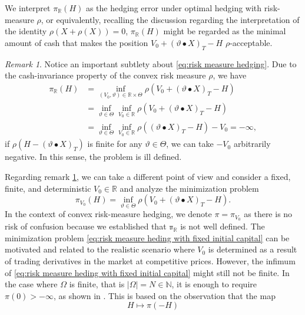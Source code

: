 \documentclass[11pt,a4paper,twoside,openany]{report}
\numberwithin{equation}{section}
\theoremstyle{plain} %
\theoremstyle{definition} %
\theoremstyle{remark} %
\newtheorem{remark}[theorem]{Remark}
\let\parencite\authnumparencite
\begin{document}
We interpret \(\pi_{\mathbb{R}}(H)\) as the hedging error under optimal hedging with risk-measure \(\rho\), or equivalently, recalling the discussion regarding the interpretation of the identity \(\rho(X+\rho(X))=0\), \(\pi_{\mathbb{R}}(H)\) might be regarded as the minimal amount of cash that makes the position \(V_0+(\vartheta\bullet X)_T-H\) \(\rho\)-acceptable. 
\begin{remark}\label{rem:ill posed problem}
Notice an important subtlety about \eqref{eq:risk measure hedging}. Due to the cash-invariance property of the convex risk measure \(\rho\), we have 
\begin{align*}
    \pi_{\mathbb{R}}(H) &= \inf_{(V_0,\vartheta)\in\mathbb{R}\times \Theta}\rho(V_0+(\vartheta\bullet X)_T-H)\\
    &=\inf_{\vartheta\in \Theta}\inf_{V_0\in\mathbb{R}}\rho(V_0+(\vartheta\bullet X)_T-H)\\
    &=\inf_{\vartheta\in \Theta}\inf_{V_0\in\mathbb{R}}\rho((\vartheta\bullet X)_T-H)-V_0=-\infty,
\end{align*}
if \(\rho(H-(\vartheta\bullet X)_T)\) is finite for any \(\vartheta\in\Theta\),
 we can take \(-V_0\) arbitrarily negative. In this sense, the problem is ill defined. 
\end{remark}
Regarding remark \ref{rem:ill posed problem}, 
we can take a different point of view and consider a fixed, finite, and deterministic \(V_0\in\mathbb{R}\) and analyze the minimization problem 
\begin{equation}\label{eq:risk measure heding with fixed initial capital}
    \pi_{V_0}(H)=\inf_{\vartheta\in\Theta}\rho(V_0+(\vartheta\bullet X)_T-H).
\end{equation}
In the context of convex risk-measure hedging, we denote \(\pi=\pi_{V_0}\) as there is no risk of confusion because we established that \(\mathbb{\pi}_{\mathbb{R}}\) is not well defined. 
The minimization problem \eqref{eq:risk measure heding with fixed initial capital} can be motivated and related to the realistic scenario where \(V_0\) is determined as a result of trading derivatives in the market at competitive prices. However, the infimum of \eqref{eq:risk measure heding with fixed initial capital} might still not be finite.  In the case where \(\Omega\) is finite, that is \(|\Omega|=N\in\mathbb{N}\), it is enough to require \(\pi(0)>-\infty\), as shown in \parencite[Cor.~3.5.]{Buehler2018DeepHedging}. This is based on the observation that the map 
\begin{equation*}
    H\mapsto \pi(-H)
\end{equation*}
\end{document}
